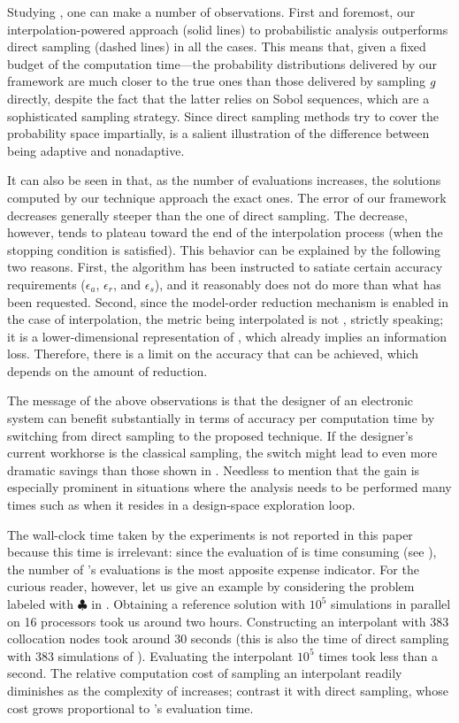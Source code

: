 Studying , one can make a number of observations. First and
foremost, our interpolation-powered approach (solid lines) to probabilistic
analysis outperforms direct sampling (dashed lines) in all the cases. This means
that, given a fixed budget of the computation time---the probability
distributions delivered by our framework are much closer to the true ones than
those delivered by sampling $g$ directly, despite the fact that the latter
relies on Sobol sequences, which are a sophisticated sampling strategy. Since
direct sampling methods try to cover the probability space impartially,
 is a salient illustration of the difference between being
adaptive and nonadaptive.

It can also be seen in  that, as the number of evaluations
increases, the solutions computed by our technique approach the exact ones. The
error of our framework decreases generally steeper than the one of direct
sampling. The decrease, however, tends to plateau toward the end of the
interpolation process (when the stopping condition is satisfied). This behavior
can be explained by the following two reasons. First, the algorithm has been
instructed to satiate certain accuracy requirements ($\epsilon_a$, $\epsilon_r$,
and $\epsilon_s$), and it reasonably does not do more than what has been
requested. Second, since the model-order reduction mechanism is enabled in the
case of interpolation, the metric being interpolated is not \g, strictly
speaking; it is a lower-dimensional representation of \g, which already implies
an information loss. Therefore, there is a limit on the accuracy that can be
achieved, which depends on the amount of reduction.

The message of the above observations is that the designer of an electronic
system can benefit substantially in terms of accuracy per computation time by
switching from direct sampling to the proposed technique. If the designer's
current workhorse is the classical  sampling, the switch might lead to
even more dramatic savings than those shown in . Needless to
mention that the gain is especially prominent in situations where the analysis
needs to be performed many times such as when it resides in a design-space
exploration loop.

\begin{remark}
The wall-clock time taken by the experiments is not reported in this paper
because this time is irrelevant: since the evaluation of \g is time consuming
(see ), the number of \g's evaluations is the most apposite
expense indicator. For the curious reader, however, let us give an example by
considering the problem labeled with $\clubsuit$ in . Obtaining a
reference solution with $10^5$ simulations in parallel on 16 processors took us
around two hours. Constructing an interpolant with 383 collocation nodes took
around 30 seconds (this is also the time of direct sampling with 383 simulations
of \g). Evaluating the interpolant $10^5$ times took less than a second. The
relative computation cost of sampling an interpolant readily diminishes as the
complexity of \g increases; contrast it with direct sampling, whose cost grows
proportional to \g's evaluation time.
\end{remark}

